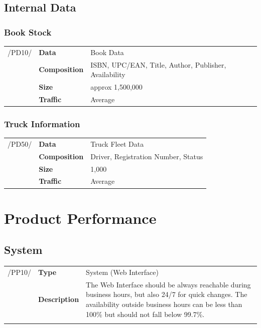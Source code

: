 \documentclass[11pt,a4paper,oneside,svgnames]{report}
\begin{document}
\section{Internal Data}
\subsection{Book Stock}
\begin{tabular}{llp{8cm}}
\cellcolor{white}/PD10/	& \textbf{Data}			& Book Data\\
\cellcolor{white}		& \textbf{Composition}	& ISBN, UPC/EAN, Title, Author, Publisher, Availability\\
\cellcolor{white}		& \textbf{Size}		& approx 1,500,000\\
\cellcolor{white}		& \textbf{Traffic}		& Average\\
\end{tabular} 
\subsection{Truck Information}
\begin{tabular}{llp{8cm}}
\cellcolor{white}/PD50/	& \textbf{Data}			& Truck Fleet Data\\
\cellcolor{white}		& \textbf{Composition}	& Driver, Registration Number, Status\\
\cellcolor{white}		& \textbf{Size}		& 1,000\\
\cellcolor{white}		& \textbf{Traffic}		& Average\\
\end{tabular} 

\chapter{Product Performance}
\section{System}
\noindent
\begin{tabular}{llp{8cm}}
\cellcolor{white}/PP10/	& \textbf{Type}			& System (Web Interface)\\
\cellcolor{white}		& \textbf{Description}	& The Web Interface should be always reachable during business hours, but also 24/7 for quick changes. The availability outside business hours can be less than 100\% but should not fall below 99.7\%.\\
\cellcolor{white}		\hfill \\
\end{tabular}
\end{document}
